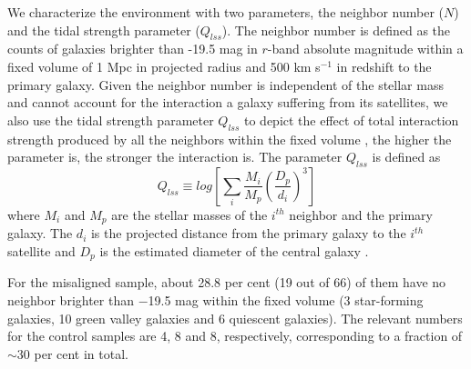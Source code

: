 \documentclass[a4paper,fleqn,usenatbib]{mnras}
\begin{document}
We characterize the environment with two parameters, the neighbor number ($N$) and the tidal strength parameter ($Q_{lss}$). The neighbor number is defined as the counts of galaxies brighter than -19.5 mag in $r$-band absolute magnitude 
within a fixed volume of 1 Mpc in projected radius and 500 km s$^{-1}$ in redshift to the primary galaxy. Given the neighbor number is independent of the stellar mass and cannot account for the interaction a galaxy suffering from its satellites, we also use the tidal strength parameter $Q_{lss}$ to depict the effect of total interaction strength produced by all the neighbors within the fixed volume \citep{verley-2007,maria-2015}, the higher the parameter is, the stronger the interaction is. The parameter $Q_{lss}$ is defined as
\begin{equation} \label{equ:qlss}
Q_{lss} \equiv  log\left[\sum_{i} \frac{M_{i}}{M_{p}}\left(\frac{D_{p}}{d_{i}}\right)^{3}\right]
\end{equation}
where $M_{i}$ and $M_{p}$ are the stellar masses of the $i^{th}$ neighbor and the primary galaxy. The $d_{i}$ is the projected distance from the primary galaxy to the $i^{th}$ satellite and $D_{p}$ is the estimated diameter of the central galaxy \citep{maria-2015}. %

For the misaligned sample, about 28.8 per cent (19 out of 66) of them have no neighbor brighter than $-$19.5 mag within the fixed volume (3 star-forming galaxies, 10 green valley galaxies and 6 quiescent galaxies). The relevant numbers for the control samples are 4, 8 and 8, respectively, corresponding to a fraction of $\sim$30 per cent in total.

\end{document}
